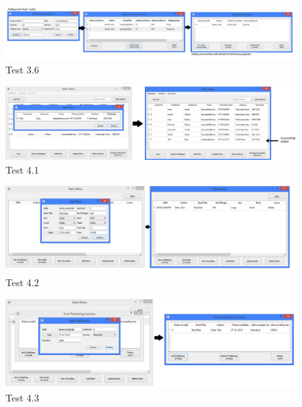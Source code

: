 \begin{landscape}
\begin{figure}[H]
    \includegraphics[width=\textwidth]{./Testing/Evidence/Series3/BookInvoicePaymentValidation.png}
    \caption{Test 3.6}  \label{fig:BookInvoicePaymentValidation}
\end{figure}


\begin{figure}[H]
    \includegraphics[width=\textwidth]{./Testing/Evidence/Series4/AddAuthorTest.png}
    \caption{Test 4.1}  \label{fig:AddAuthorTest}
\end{figure}

\begin{figure}[H]
    \includegraphics[width=\textwidth]{./Testing/Evidence/Series4/AddBookTest.png}
    \caption{Test 4.2}  \label{fig:AddBookTest}
\end{figure}

\begin{figure}[H]
    \includegraphics[width=\textwidth]{./Testing/Evidence/Series4/AddPubInvoiceTest.png}
    \caption{Test 4.3}  \label{fig:AddPubInvoiceTest}
\end{figure}


\end{landscape}
